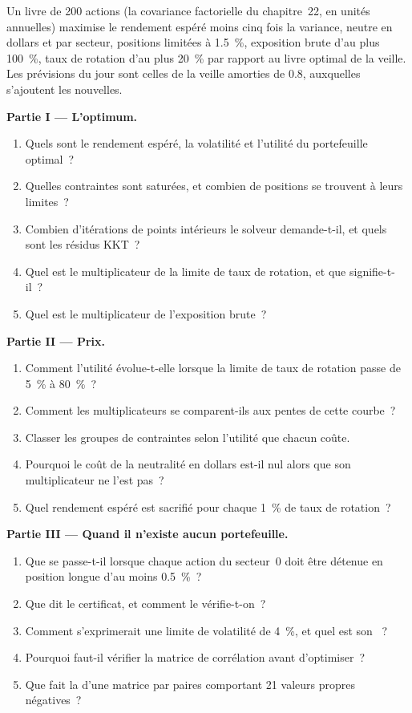 \begin{problem}\label{pb:qm:convex-optimisation:1}
Un livre de 200 actions (la covariance factorielle du chapitre~22, en unités annuelles) maximise le rendement espéré moins cinq fois la variance, neutre en dollars et par secteur, positions limitées à 1.5~\%, exposition brute
d'au plus 100~\%, taux de rotation d'au plus 20~\% par rapport au livre optimal de la veille. Les prévisions du jour sont celles de la veille amorties de 0.8, auxquelles s'ajoutent les nouvelles.

\medskip\noindent\textbf{Partie I --- L'optimum.}
\begin{enumerate}
\item Quels sont le rendement espéré, la volatilité et l'utilité du portefeuille optimal~?
\item Quelles contraintes sont saturées, et combien de positions se trouvent à leurs limites~?
\item Combien d'itérations de points intérieurs le solveur demande-t-il, et quels sont les résidus KKT~?
\item Quel est le multiplicateur de la limite de taux de rotation, et que signifie-t-il~?
\item Quel est le multiplicateur de l'exposition brute~?
\end{enumerate}

\medskip\noindent\textbf{Partie II --- Prix.}
\begin{enumerate}[resume]
\item Comment l'utilité évolue-t-elle lorsque la limite de taux de rotation passe de 5~\% à 80~\%~?
\item Comment les multiplicateurs se comparent-ils aux pentes de cette courbe~?
\item Classer les groupes de contraintes selon l'utilité que chacun coûte.
\item Pourquoi le coût de la neutralité en dollars est-il nul alors que son multiplicateur ne l'est pas~?
\item Quel rendement espéré est sacrifié pour chaque 1~\% de taux de rotation~?
\end{enumerate}

\medskip\noindent\textbf{Partie III --- Quand il n'existe aucun portefeuille.}
\begin{enumerate}[resume]
\item Que se passe-t-il lorsque chaque action du secteur~0 doit être détenue en position longue d'au moins 0.5~\%~?
\item Que dit le certificat, et comment le vérifie-t-on~?
\item Comment s'exprimerait une limite de volatilité de 4~\%, et quel est son ~?
\item Pourquoi faut-il vérifier la matrice de corrélation avant d'optimiser~?
\item Que fait la  d'une matrice par paires comportant 21 valeurs propres négatives~?
\end{enumerate}


\end{problem}
